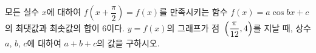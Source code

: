 모든 실수 $x$에 대하여 $f\!\left(x+\dfrac{\pi}{2}\right)=f(x)$를 만족시키는 함수 $f(x)=a\cos bx+c$의 최댓값과 최솟값의 합이 $6$이다. $y=f(x)$의 그래프가 점~$\left(\dfrac{\pi}{12}{,}\mkern3mu\mathopen{}4\right)$를 지날 때, 상수 $a$, $b$, $c$에 대하여 $a+b+c$의 값을 구하시오. 
